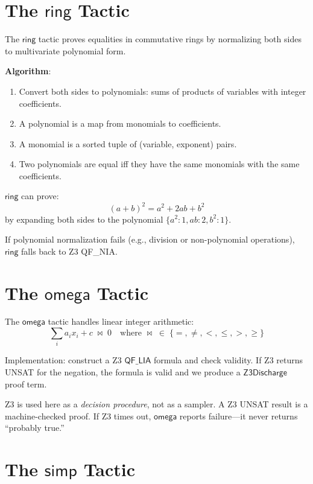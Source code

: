 \section{The \texorpdfstring{$\mathsf{ring}$}{ring} Tactic}

The $\mathsf{ring}$ tactic proves equalities in commutative rings
by normalizing both sides to multivariate polynomial form.

\textbf{Algorithm}:
\begin{enumerate}
\item Convert both sides to polynomials: sums of products of variables
  with integer coefficients.
\item A polynomial is a map from monomials to coefficients.
\item A monomial is a sorted tuple of (variable, exponent) pairs.
\item Two polynomials are equal iff they have the same monomials with
  the same coefficients.
\end{enumerate}

\begin{example}
$\mathsf{ring}$ can prove:
\[
  (a + b)^2 = a^2 + 2ab + b^2
\]
by expanding both sides to the polynomial $\{a^2: 1, ab: 2, b^2: 1\}$.
\end{example}

If polynomial normalization fails (e.g., division or non-polynomial
operations), $\mathsf{ring}$ falls back to Z3 QF\_NIA.


\section{The \texorpdfstring{$\mathsf{omega}$}{omega} Tactic}

The $\mathsf{omega}$ tactic handles linear integer arithmetic:
\[
  \sum_i a_i x_i + c \;\bowtie\; 0
  \quad \text{where } \bowtie \;\in\; \{=, \neq, <, \leq, >, \geq\}
\]

Implementation: construct a Z3 $\mathsf{QF\_LIA}$ formula and check
validity.  If Z3 returns UNSAT for the negation, the formula is valid
and we produce a $\mathsf{Z3Discharge}$ proof term.

\begin{remark}
Z3 is used here as a \emph{decision procedure}, not as a sampler.
A Z3 UNSAT result is a machine-checked proof.  If Z3 times out,
$\mathsf{omega}$ reports failure---it never returns ``probably true.''
\end{remark}


\section{The \texorpdfstring{$\mathsf{simp}$}{simp} Tactic}

